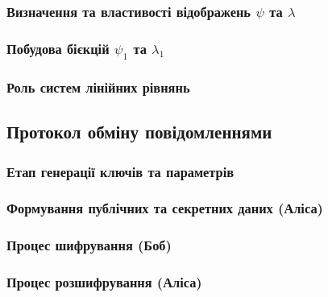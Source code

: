 \documentclass[a4paper,12pt]{article}
\begin{document}
    \subsubsection{Визначення та властивості відображень \(\psi\) та \(\lambda\)} %

    \subsubsection{Побудова бієкцій \(\psi_1\) та \(\lambda_1\)} %

    \subsubsection{Роль систем лінійних рівнянь} %

    \subsection{Протокол обміну повідомленнями} %

    \subsubsection{Етап генерації ключів та параметрів} %

    \subsubsection{Формування публічних та секретних даних (Аліса)} %

    \subsubsection{Процес шифрування (Боб)} %

    \subsubsection{Процес розшифрування (Аліса)} %
\end{document}
